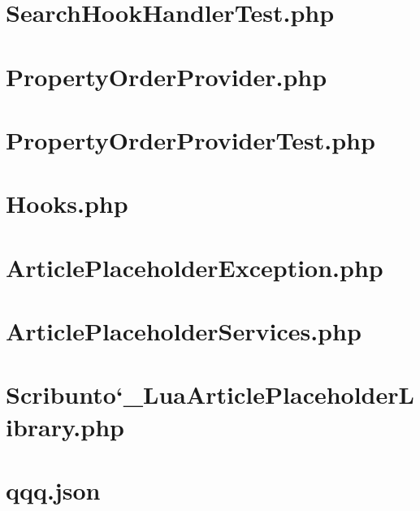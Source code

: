 \section{SearchHookHandlerTest.php}


\section{PropertyOrderProvider.php}


\section{PropertyOrderProviderTest.php}


\section{Hooks.php}


\section{ArticlePlaceholderException.php}


\section{ArticlePlaceholderServices.php}


\section{Scribunto\char`_LuaArticlePlaceholderLibrary.php}


\section{qqq.json}


